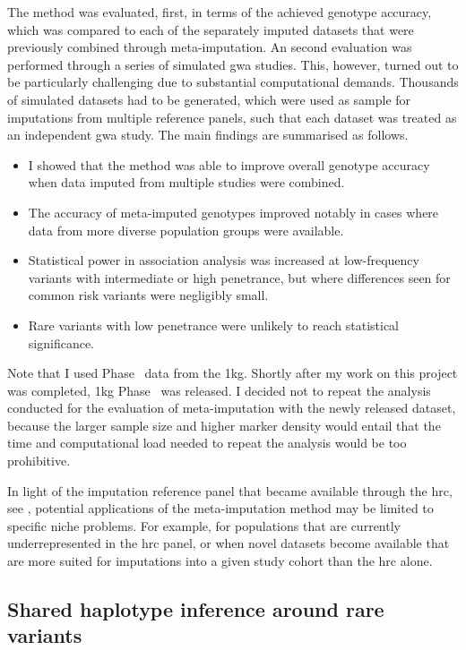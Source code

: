 The method was evaluated, first, in terms of the achieved genotype accuracy, which was compared to each of the separately imputed datasets that were previously combined through meta-imputation.
An second evaluation was performed through a series of simulated \gls{gwa} studies.
This, however, turned out to be particularly challenging due to substantial computational demands.
Thousands of simulated datasets had to be generated, which were used as sample for imputations from multiple reference panels, such that each dataset was treated as an independent \gls{gwa} study.
The main findings are summarised as follows.
\begin{itemize}
\item%
I showed that the method was able to improve overall genotype accuracy when data imputed from multiple studies were combined.
\item%
The accuracy of meta-imputed genotypes improved notably in cases where data from more diverse population groups were available.
\item%
Statistical power in association analysis was increased at low-frequency variants with intermediate or high penetrance, but where differences seen for common risk variants were negligibly small.
\item%
Rare variants with low penetrance were unlikely to reach statistical significance.
\end{itemize}

Note that I used Phase~ data from the \gls{1kg}.
Shortly after my work on this project was completed, \gls{1kg} Phase~ was released.
I decided not to repeat the analysis conducted for the evaluation of meta-imputation with the newly released dataset, because the larger sample size and higher marker density would entail that the time and computational load needed to repeat the analysis would be too prohibitive.

In light of the imputation reference panel that became available through the \gls{hrc}, see \citet{McCarthy:2016gs}, potential applications of the meta-imputation method may be limited to specific niche problems.
For example, for populations that are currently underrepresented in the \gls{hrc} panel, or when novel datasets become available that are more suited for imputations into a given study cohort than the \gls{hrc} alone.




\subsection{Shared haplotype inference around rare variants}


